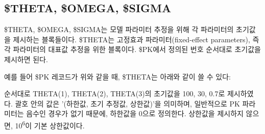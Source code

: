 \documentclass[
  10pt,
  krantz2,
  a4paper]{krantz}
\newenvironment{Shaded}{\begin{snugshade}}{\end{snugshade}}
\newcommand{\DecValTok}[1]{\textcolor[rgb]{0.00,0.00,0.81}{#1}}
\newcommand{\FloatTok}[1]{\textcolor[rgb]{0.00,0.00,0.81}{#1}}
\newcommand{\KeywordTok}[1]{\textcolor[rgb]{0.13,0.29,0.53}{\textbf{#1}}}
\newcommand{\NormalTok}[1]{#1}
\newcommand{\OperatorTok}[1]{\textcolor[rgb]{0.81,0.36,0.00}{\textbf{#1}}}
\newcommand{\StringTok}[1]{\textcolor[rgb]{0.31,0.60,0.02}{#1}}
\theoremstyle{definition}
\theoremstyle{definition}
\theoremstyle{definition}
\theoremstyle{remark}
\begin{document}
\hypertarget{theta-omega-sigma}{%
\subsection{\$THETA, \$OMEGA, \$SIGMA}\label{theta-omega-sigma}}

\$THETA, \$OMEGA, \$SIGMA는 모델 파라미터 추정을 위해 각 파라미터의 초기값을 제시하는 블록들이다. \$THETA는 고정효과 파라미터(fixed-effect parameters), 즉 각 파라미터의 대표값 추정을 위한 블록이다. \$PK에서 정의된 번호 순서대로 초기값을 제시하면 된다.

\begin{Shaded}
\end{Shaded}

예를 들어 \$PK 레코드가 위와 같을 때, \$THETA는 아래와 같이 쓸 수 있다:

\begin{Shaded}
\end{Shaded}

순서대로 THETA(1), THETA(2), THETA(3)의 초기값을 100, 30, 0.7로 제시하였다. 괄호 안의 값은 '(하한값, 초기 추정값, 상한값)'을 의미하며, 일반적으로 PK 파라미터는 음수인 경우가 없기 때문에, 하한값을 0으로 정의한다. 상한값을 제시하지 않으면, 10\textsuperscript{6}이 기본 상한값이다.
\end{document}
